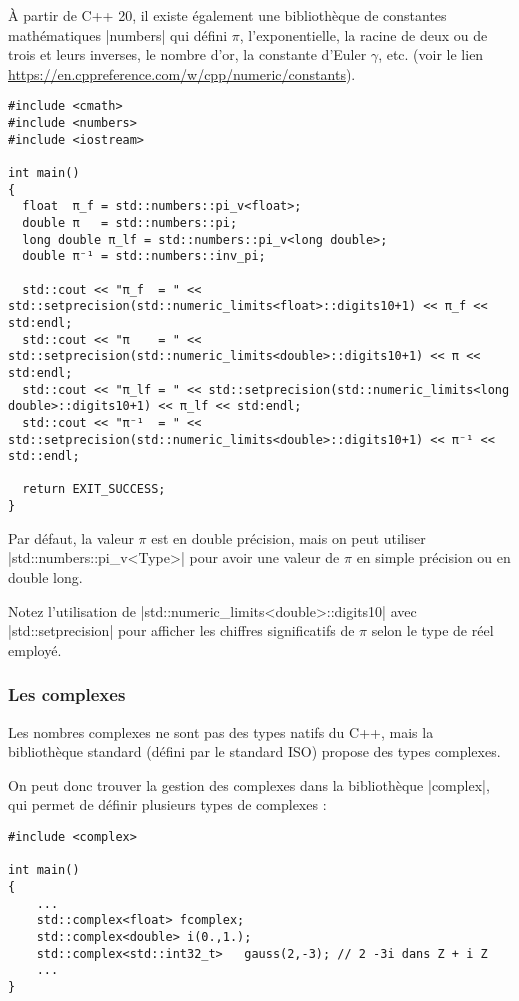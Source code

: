 À partir de C++ 20, il existe également une bibliothèque de constantes mathématiques |numbers| qui défini $\pi$, l'exponentielle, la racine de deux ou de trois et leurs inverses, le nombre d'or, la constante d'Euler $\gamma$, etc. (voir le lien  \url{https://en.cppreference.com/w/cpp/numeric/constants}).


\begin{lstlisting}[caption=Exemple d'utilisation des constantes en C++ 20]
#include <cmath>
#include <numbers>
#include <iostream>

int main()
{
  float  π_f = std::numbers::pi_v<float>;
  double π   = std::numbers::pi;
  long double π_lf = std::numbers::pi_v<long double>;
  double π⁻¹ = std::numbers::inv_pi;

  std::cout << "π_f  = " << std::setprecision(std::numeric_limits<float>::digits10+1) << π_f << std:endl;
  std::cout << "π    = " << std::setprecision(std::numeric_limits<double>::digits10+1) << π << std:endl;
  std::cout << "π_lf = " << std::setprecision(std::numeric_limits<long double>::digits10+1) << π_lf << std:endl;
  std::cout << "π⁻¹  = " << std::setprecision(std::numeric_limits<double>::digits10+1) << π⁻¹ << std::endl;

  return EXIT_SUCCESS;
}
\end{lstlisting}

Par défaut, la valeur $\pi$ est en double précision, mais on peut utiliser |std::numbers::pi_v<Type>| pour avoir une valeur de $\pi$ en simple précision ou en double long.

Notez l'utilisation de |std::numeric_limits<double>::digits10| avec |std::setprecision| pour afficher les chiffres
significatifs de $\pi$ selon le type de réel employé.

\subsubsection{Les complexes}

Les nombres complexes ne sont pas des types natifs du C++, mais la bibliothèque standard (défini par le standard ISO) propose des types complexes.

On peut donc trouver la gestion des complexes dans la bibliothèque |complex|, qui permet de définir plusieurs types de complexes :
\begin{lstlisting}[caption=Exemple de déclaration et de définition de nombres complexes]
#include <complex>

int main()
{
    ...
    std::complex<float> fcomplex;
    std::complex<double> i(0.,1.);
    std::complex<std::int32_t>   gauss(2,-3); // 2 -3i dans Z + i Z
    ...
}
\end{lstlisting}

